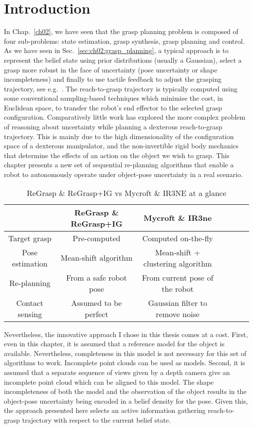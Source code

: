 \section{Introduction}\label{sec:ch07:introduction}

In Chap.~\ref{ch02}, we have seen that the grasp planning problem is composed of four sub-problems: state estimation, grasp synthesis, grasp planning and control. As we have seen in Sec.~\ref{sec:ch02:grasp_planning}, a typical approach is to represent the belief state using prior distributions (usually a Gaussian), select a grasp more robust in the face of uncertainty (pose uncertainty or shape incompleteness) and  finally to use tactile feedback to adjust the grasping trajectory, see e.g.~\citep{bib:nikandrova_2014}. The reach-to-grasp trajectory is typically computed using some conventional sampling-based techniques which minimise the cost, in Euclidean space, to transfer the robot's end effector to the selected grasp configuration. Comparatively little work has explored the more complex problem of reasoning about uncertainty while planning a dexterous reach-to-grasp trajectory. This is mainly due to the high dimensionality of the configuration space of a dexterous manipulator, and the non-invertible rigid body mechanics that determine the effects of an action on the object we wish to grasp. This chapter presents a new set of sequential re-planning algorithms that enable a robot to autonomously operate under object-pose uncertainty in a real scenario. 

\begin{table*}[!t]
\centering
\caption{ReGrasp \& ReGrasp+IG vs Mycroft \& IR3NE at a glance}
\begin{tabular}{ | c | c | c | c | c | c | c |}
\hline
		 & 	ReGrasp \& ReGrasp+IG & Mycroft \& IR3ne \\\hline
\hline

Target grasp	& Pre-computed & Computed on-the-fly \\\hline
Pose estimation	& Mean-shift algorithm	& Mean-shift + clustering algorithm \\\hline
Re-planning	& From a safe robot pose & From current pose of the robot \\\hline
Contact sensing & Assumed to be perfect & Gaussian filter to remove noise \\\hline
\end{tabular}
\label{tab:results}
\end{table*}

Nevertheless, the innovative approach I chose in this thesis comes at a cost. First, even in this chapter, it is assumed that a reference model for the object is available. Nevertheless, completeness in this model is not necessary for this set of algorithms to work. Incomplete point clouds can be used as models. Second, it is assumed that a separate sequence of views given by a depth camera give an incomplete point cloud which can be aligned to this model. The shape incompleteness of both the model and the observation of the object results in the object-pose uncertainty being encoded in a belief density for the pose. Given this, the approach presented here selects an active information gathering reach-to-grasp trajectory with respect to the current belief state.

